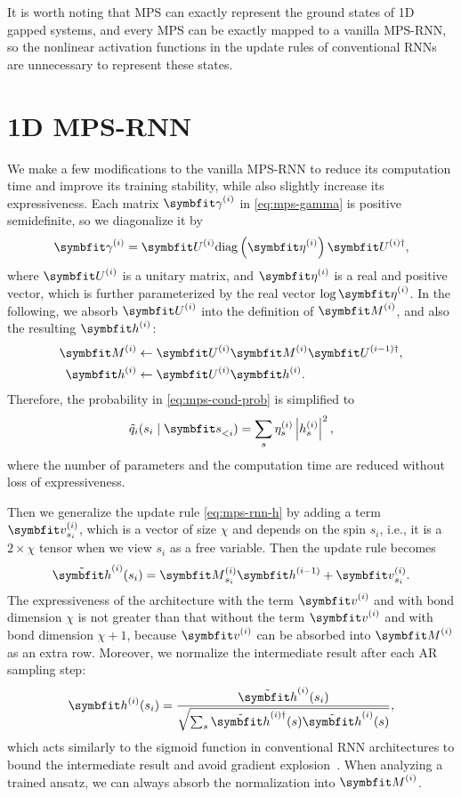 It is worth noting that MPS can exactly represent the ground states of 1D gapped systems, and every MPS can be exactly mapped to a vanilla MPS-RNN, so the nonlinear activation functions in the update rules of conventional RNNs are unnecessary to represent these states.

\section{1D MPS-RNN}

We make a few modifications to the vanilla MPS-RNN to reduce its computation time and improve its training stability, while also slightly increase its expressiveness. Each matrix $\mga^{(i)}$ in \cref{eq:mps-gamma} is positive semidefinite, so we diagonalize it by
\begin{equation}
\mga^{(i)} = \mU^{(i)} \diag\left( \vet^{(i)} \right) \mU^{(i) \dagger},
\end{equation}
where $\mU^{(i)}$ is a unitary matrix, and $\vet^{(i)}$ is a real and positive vector, which is further parameterized by the real vector $\log \vet^{(i)}$. In the following, we absorb $\mU^{(i)}$ into the definition of $\mM^{(i)}$, and also the resulting $\vh^{(i)}$:
\begin{align}
\mM^{(i)} &\gets \mU^{(i)} \mM^{(i)} \mU^{(i - 1) \dagger}, \\
\vh^{(i)} &\gets \mU^{(i)} \vh^{(i)}.
\end{align}
Therefore, the probability in \cref{eq:mps-cond-prob} is simplified to
\begin{equation}
\tilde{q}_i(s_i \mid \vs_{< i}) = \sum_s \eta^{(i)}_s \left| h^{(i)}_s \right|^2,
\label{eq:mps-rnn-p-eta}
\end{equation}
where the number of parameters and the computation time are reduced without loss of expressiveness.

Then we generalize the update rule \cref{eq:mps-rnn-h} by adding a term $\vv^{(i)}_{s_i}$, which is a vector of size $\chi$ and depends on the spin $s_i$, i.e., it is a $2 \times \chi$ tensor when we view $s_i$ as a free variable. Then the update rule becomes
\begin{equation}
\tilde{\vh}^{(i)}(s_i) = \mM^{(i)}_{s_i} \vh^{(i - 1)} + \vv^{(i)}_{s_i}.
\label{eq:mps-rnn-h-v}
\end{equation}
The expressiveness of the architecture with the term $\vv^{(i)}$ and with bond dimension $\chi$ is not greater than that without the term $\vv^{(i)}$ and with bond dimension $\chi + 1$, because $\vv^{(i)}$ can be absorbed into $\mM^{(i)}$ as an extra row. Moreover, we normalize the intermediate result after each AR sampling step:
\begin{equation}
\vh^{(i)}(s_i) = \frac
{\tilde{\vh}^{(i)}(s_i)}
{\sqrt{\sum_s \tilde{\vh}^{(i) \dagger}(s) \tilde{\vh}^{(i)}(s)}},
\end{equation}
which acts similarly to the sigmoid function in conventional RNN architectures to bound the intermediate result and avoid gradient explosion~\cite{pascanu2013difficulty}. When analyzing a trained ansatz, we can always absorb the normalization into $\mM^{(i)}$.

